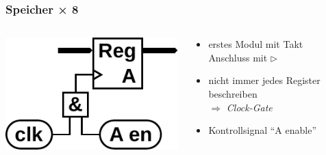 \documentclass[t,aspectratio=169]{beamer}
\begin{document}
\begin{frame}
  \frametitle{Speicher × 8}

  \begin{columns}[T]
    \begin{column}{.45\textwidth}
      \includegraphics[width=\linewidth]{register.pdf}
    \end{column}
    \begin{column}{.45\textwidth}
      \begin{itemize}
      \item erstes Modul mit Takt\\
        Anschluss mit {\Large$\triangleright$}
      \item nicht immer jedes Register beschreiben\\
        $\Rightarrow$ \emph{Clock-Gate}
      \item Kontrollsignal \enquote{A enable}
      \end{itemize}
    \end{column}
  \end{columns}

\end{frame}
\end{document}
